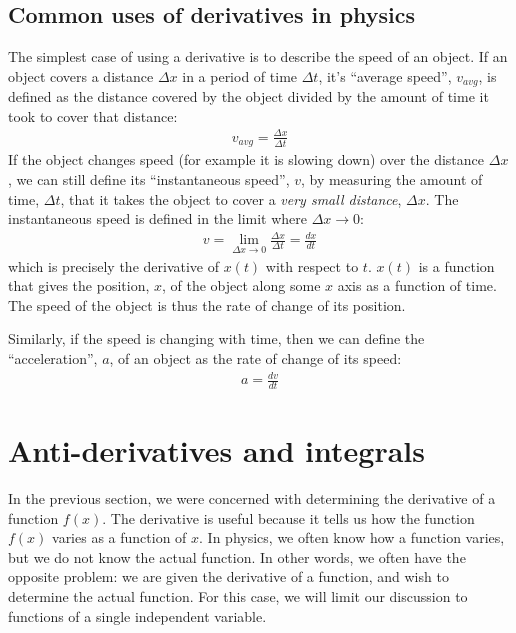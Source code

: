 \subsection{Common uses of derivatives in physics}
The simplest case of using a derivative is to describe the speed of an object. If an object covers a distance $\Delta x$ in a period of time $\Delta t$, it's ``average speed'', $v_{avg}$, is defined as the distance covered by the object divided by the amount of time it took to cover that distance:
\begin{align*}
v_{avg} = \frac{\Delta x}{\Delta t}
\end{align*}
If the object changes speed (for example it is slowing down) over the distance $\Delta x$, we can still define its ``instantaneous speed'', $v$, by measuring the amount of time, $\Delta t$, that it takes the object to cover a \textit{very small distance}, $\Delta x$. The instantaneous speed is defined in the limit where $\Delta x \to 0$:
\begin{align*}
v = \lim_{\Delta x\to 0}\frac{\Delta x}{\Delta t}=\frac{dx}{dt}
\end{align*} 
which is precisely the derivative of $x(t)$ with respect to $t$. $x(t)$ is a function that gives the position, $x$, of the object along some $x$ axis as a function of time. The speed of the object is thus the rate of change of its position.

Similarly, if the speed is changing with time, then we can define the ``acceleration'', $a$, of an object as the rate of change of its speed:
\begin{align*}
a = \frac{dv}{dt}
\end{align*}


\section{Anti-derivatives and integrals}\label{sec:calculus:integrals}
In the previous section, we were concerned with determining the derivative of a function $f(x)$. The derivative is useful because it tells us how the function $f(x)$ varies as a function of $x$. In physics, we often know how a function varies, but we do not know the actual function. In other words, we often have the opposite problem: we are given the derivative of a function, and wish to determine the actual function. For this case, we will limit our discussion to functions of a single independent variable.

